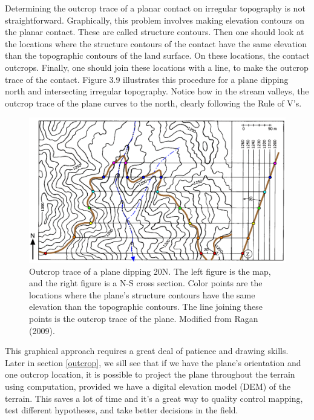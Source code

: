 \documentclass[a4paper , 12pt]{book}
\begin{document}
Determining the outcrop trace of a planar contact on irregular topography is not straightforward. Graphically, this problem involves making elevation contours on the planar contact. These are called structure contours. Then one should look at the locations where the structure contours of the contact have the same elevation than the topographic contours of the land surface. On these locations, the contact outcrops. Finally, one should join these locations with a line, to make the outcrop trace of the contact. Figure 3.9 illustrates this procedure for a plane dipping north and intersecting irregular topography. Notice how in the stream valleys, the outcrop trace of the plane curves to the north, clearly following the Rule of V’s.

\begin{figure}[ht]
    \centering
    \includegraphics[width=13cm]{Figures/ch3f9.png}
    \caption{Outcrop trace of a plane dipping 20\degree N. The left figure is the map, and the right figure is a N-S cross section. Color points are the locations where the plane's structure contours have the same elevation than the topographic contours. The line joining these points is the outcrop trace of the plane. Modified from Ragan (2009).}
    \label{fig:outrace}
\end{figure}

This graphical approach requires a great deal of patience and drawing skills. Later in section \ref{outcrop}, we sill see that if we have the plane’s orientation and one outcrop location, it is possible to project the plane throughout the terrain using computation, provided we have a digital elevation model (DEM) of the terrain. This saves a lot of time and it’s a great way to quality control mapping, test different hypotheses, and take better decisions in the field.

\end{document}
